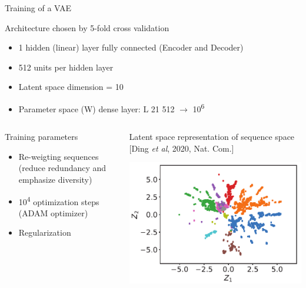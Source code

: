 \documentclass[presentation,smaller]{beamer}
\begin{document}
\begin{frame}[label={sec:orgd96c46e}]{Training of a VAE}
\begin{block}{Architecture chosen by 5-fold cross validation}
\begin{itemize}
\item 1 \texttimes{} hidden (linear) layer fully connected (Encoder and Decoder)
\item 512 units per hidden layer
\item Latent space dimension = 10
\item Parameter space (W) dense layer: L \texttimes{} 21 \texttimes{} 512 \(\rightarrow\) 10\textsuperscript{6}
\end{itemize}
\end{block}
\begin{columns}
\begin{column}{0.5\columnwidth}
\begin{block}{Training parameters}
\begin{itemize}
\item Re-weigting sequences (reduce redundancy and emphasize diversity)
\item 10\textsuperscript{4} optimization steps (ADAM optimizer)
\item Regularization
\end{itemize}
\end{block}
\end{column}

\begin{column}{0.5\columnwidth}
\begin{block}{Latent space representation of sequence space}
[Ding \emph{et al}, 2020, Nat. Com.]
\begin{center}
\includegraphics[width=.9\linewidth]{img/proj_prot_ding.png}
\end{center}
\end{block}
\end{column}
\end{columns}
\end{frame}
\end{document}

